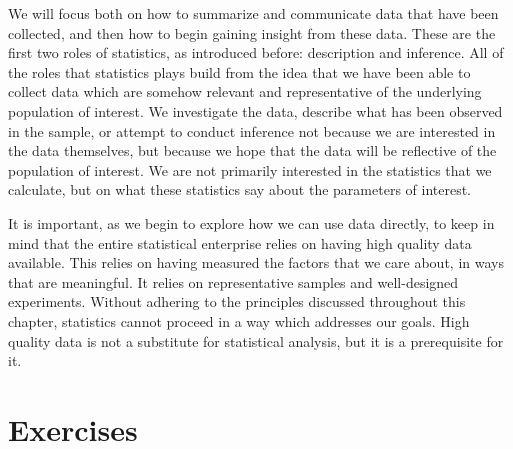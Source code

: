 \documentclass[
  letterpaper,
  DIV=11,
  numbers=noendperiod]{scrreprt}
\theoremstyle{definition}
\theoremstyle{definition}
\theoremstyle{definition}
\theoremstyle{remark}
\begin{document}
We will focus both on how to summarize and communicate data that have
been collected, and then how to begin gaining insight from these data.
These are the first two roles of statistics, as introduced before:
description and inference. All of the roles that statistics plays build
from the idea that we have been able to collect data which are somehow
relevant and representative of the underlying population of interest. We
investigate the data, describe what has been observed in the sample, or
attempt to conduct inference not because we are interested in the data
themselves, but because we hope that the data will be reflective of the
population of interest. We are not primarily interested in the
statistics that we calculate, but on what these statistics say about the
parameters of interest.

It is important, as we begin to explore how we can use data directly, to
keep in mind that the entire statistical enterprise relies on having
high quality data available. This relies on having measured the factors
that we care about, in ways that are meaningful. It relies on
representative samples and well-designed experiments. Without adhering
to the principles discussed throughout this chapter, statistics cannot
proceed in a way which addresses our goals. High quality data is not a
substitute for statistical analysis, but it is a prerequisite for it.

\section*{Exercises}\label{exercises-8}

\end{document}
